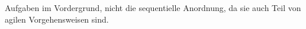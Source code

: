 Aufgaben im Vordergrund, nicht die sequentielle Anordnung, da sie auch Teil 
von agilen Vorgehensweisen sind.\\ 

